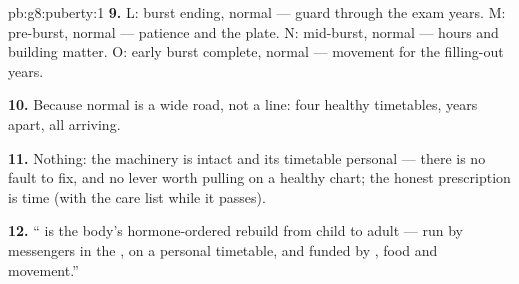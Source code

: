 \begin{solution}{pb:g8:puberty:1}
\textbf{9.} L: burst ending, normal --- guard 
through the exam years. M: pre-burst, normal --- patience
and the plate. N: mid-burst, normal ---  hours and
building matter. O: early burst complete, normal ---
movement for the filling-out years.

\textbf{10.} Because normal is a wide road, not a line:
four healthy timetables, years apart, all arriving.

\textbf{11.} Nothing: the machinery is intact and its
timetable personal --- there is no fault to fix, and no
lever worth pulling on a healthy chart; the honest
prescription is time (with the care list while it
passes).

\textbf{12.} `` is the body's hormone-ordered
rebuild from child to adult --- run by messengers in the
, on a personal timetable, and funded by ,
food and movement.''
\end{solution}
